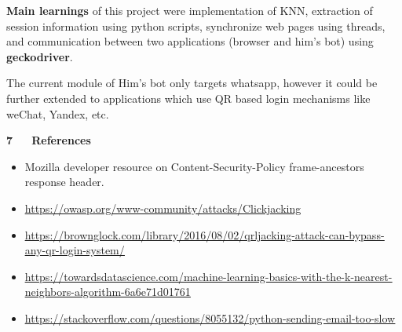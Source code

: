 \documentclass[12pt]{article}
\renewcommand{\_}{\kern-1.5pt\textunderscore\kern-1.5pt}
\begin{document}
\begin{FlushLeft}
\textbf{Main learnings} of this project were implementation of KNN, extraction of session information using python scripts, synchronize web pages using threads, and communication between two applications (browser and him’s bot) using \textbf{geckodriver}.
\end{FlushLeft}\par

\begin{FlushLeft}
The current module of Him’s bot\textbf{ }only targets whatsapp, however it could be further extended to applications which use QR based login mechanisms like weChat, Yandex, etc.
\end{FlushLeft}\par


\vspace{\baselineskip}

\vspace{\baselineskip}
\begin{FlushLeft}
{\fontsize{18pt}{21.6pt}\selectfont \textbf{7\ \ \  References}\par}
\end{FlushLeft}\par

\begin{itemize}
	\item Mozilla developer resource on Content-Security-Policy frame-ancestors response header.\par

	\item \href{https://owasp.org/www-community/attacks/Clickjacking}{\textcolor[HTML]{1155CC}{\ul{https://owasp.org/www-community/attacks/Clickjacking}}}\par

	\item \href{https://brownglock.com/library/2016/08/02/qrljacking-attack-can-bypass-any-qr-login-system/}{\textcolor[HTML]{1155CC}{\ul{https://brownglock.com/library/2016/08/02/qrljacking-attack-can-bypass-any-qr-login-system/}}}\par

	\item \href{https://towardsdatascience.com/machine-learning-basics-with-the-k-nearest-neighbors-algorithm-6a6e71d01761}{\textcolor[HTML]{1155CC}{\ul{https://towardsdatascience.com/machine-learning-basics-with-the-k-nearest-neighbors-algorithm-6a6e71d01761}}}\par

	\item \href{https://stackoverflow.com/questions/8055132/python-sending-email-too-slow}{\textcolor[HTML]{1155CC}{\ul{https://stackoverflow.com/questions/8055132/python-sending-email-too-slow}}}
\end{itemize}\par


\printbibliography
\end{document}
